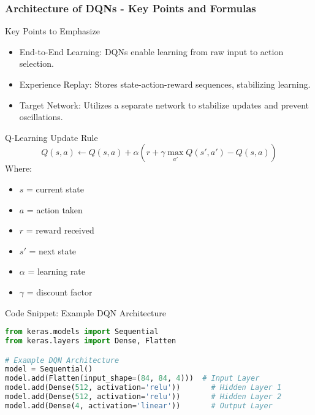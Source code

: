 \documentclass[aspectratio=169]{beamer}
\begin{document}
\begin{frame}[fragile]
    \frametitle{Architecture of DQNs - Key Points and Formulas}
    \begin{block}{Key Points to Emphasize}
        \begin{itemize}
            \item End-to-End Learning: DQNs enable learning from raw input to action selection.
            \item Experience Replay: Stores state-action-reward sequences, stabilizing learning.
            \item Target Network: Utilizes a separate network to stabilize updates and prevent oscillations.
        \end{itemize}
    \end{block}
    
    \begin{block}{Q-Learning Update Rule}
        \begin{equation}
            Q(s, a) \leftarrow Q(s, a) + \alpha \left( r + \gamma \max_{a'} Q(s', a') - Q(s, a) \right)
        \end{equation}
        Where:
        \begin{itemize}
            \item $s$ = current state
            \item $a$ = action taken
            \item $r$ = reward received
            \item $s'$ = next state
            \item $\alpha$ = learning rate
            \item $\gamma$ = discount factor
        \end{itemize}
    \end{block}
    
    \begin{block}{Code Snippet: Example DQN Architecture}
        \begin{lstlisting}[language=Python]
from keras.models import Sequential
from keras.layers import Dense, Flatten

# Example DQN Architecture
model = Sequential()
model.add(Flatten(input_shape=(84, 84, 4)))  # Input Layer
model.add(Dense(512, activation='relu'))       # Hidden Layer 1
model.add(Dense(512, activation='relu'))       # Hidden Layer 2
model.add(Dense(4, activation='linear'))       # Output Layer
        \end{lstlisting}
    \end{block}
\end{frame}
\end{document}
